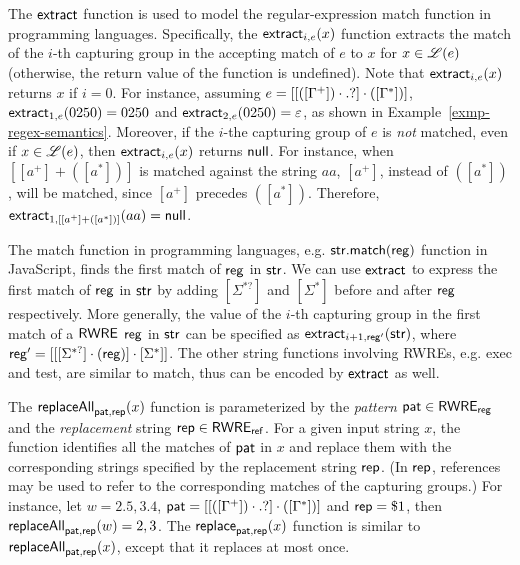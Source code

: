 The $\mathsf{extract}$ function is used to model the regular-expression match function in programming languages.
Specifically, the $\mathsf{extract}_{i, e}(x)$ function extracts the match of the $i$-th capturing group in the accepting match of $e$ to $x$ for $x \in \mathscr{L}(e)$ (otherwise, the return value of the function is undefined). Note that $\mathsf{extract}_{i, e}(x)$ returns $x$ if $i=0$. For instance, assuming $e = [[([\Gamma^+])\cdot .?] \cdot ([\Gamma^*])]$,   $\mathsf{extract}_{1, e}(0250)=0250$ and $\mathsf{extract}_{2, e}(0250)=\varepsilon$, as shown in Example~\ref{exmp-regex-semantics}. Moreover, if the $i$-the capturing group of $e$ is \emph{not} matched, even if $x \in \mathscr{L}(e)$, then $\mathsf{extract}_{i, e}(x)$ returns $\mathsf{null}$. For instance, when $[[a^+] + ([a^*])]$ is matched against the string $aa$, $[a^+]$, instead of $([a^*])$, will be matched, since $[a^+]$ precedes $([a^*])$. Therefore, $\mathsf{extract}_{1, [[a^+] + ([a^*])]}(aa) = \mathsf{null}$.

\begin{remark}
The match function in programming languages, e.g. $\sf str.match(reg)$ function in JavaScript, finds the first match of $\sf reg$ in $\sf str$. We can use $\mathsf{extract}$ to express the first match of $\sf reg$ in $\sf str$ by adding $[\Sigma^{*?}]$ and $[\Sigma^*]$ before and after $\sf reg$ respectively. More generally, the value of the $i$-th capturing group in the first match of a ${\sf RWRE}$ $\sf reg$ in $\sf str$ can be specified as $\mathsf{extract}_{i+1, {\sf reg'}}({\sf str})$, where ${\sf reg'} = [[[\Sigma^{*?}] \cdot ({\sf reg})] \cdot [\Sigma^*]]$. The other string functions involving RWREs, e.g. {\sf exec} and {\sf test}, are similar to {\sf match}, thus can be encoded by $\mathsf{extract}$ as well. 
\end{remark}

The $\mathsf{replaceAll}_{\mathsf{pat}, \mathsf{rep}}(x)$ function is parameterized by the  %
\emph{pattern} $\mathsf{pat} \in {\sf RWRE_{reg}}$ and the \emph{replacement} string $\mathsf{rep} \in {\sf RWRE_{ref}}$. For a given input string $x$, the function identifies all the %
matches of $\mathsf{pat}$ in $x$ and replace them with the corresponding strings specified by the replacement string $\mathsf{rep}$. (In $\mathsf{rep}$,  references may be used to refer to %
the corresponding matches of the capturing groups.)  For instance, let $w = 2.5, 3.4$, $\mathsf{pat} = [[([\Gamma^+])\cdot .?] \cdot ([\Gamma^*])]$ and $\mathsf{rep} = \$1$, then $\mathsf{replaceAll}_{\mathsf{pat}, \mathsf{rep}}(w) = 2, 3$. The $\mathsf{replace}_{\mathsf{pat}, \mathsf{rep}}(x)$ function is similar to $\mathsf{replaceAll}_{\mathsf{pat}, \mathsf{rep}}(x)$, except that it replaces at most once.

